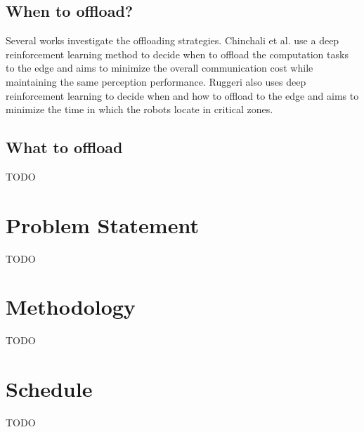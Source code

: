 \documentclass{article}
\begin{document}
\subsection{When to offload?}

Several works investigate the offloading strategies. Chinchali et al. \cite{Chinchali_2019} use a deep reinforcement learning method to decide when to offload the computation tasks to the edge and aims to minimize the overall communication cost while maintaining the same perception performance. Ruggeri \cite{Ruggeri2022} also uses deep reinforcement learning to decide when and how to offload to the edge and aims to minimize the time in which the robots locate in critical zones. 

\subsection{What to offload}

TODO

\section{Problem Statement}

TODO

\section{Methodology}

TODO

\section{Schedule}

TODO





\end{document}

